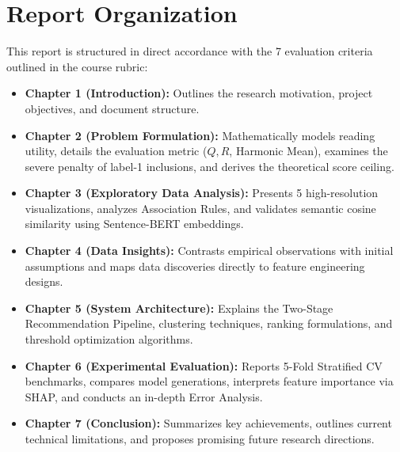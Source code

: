\section{Report Organization}
This report is structured in direct accordance with the 7 evaluation criteria outlined in the course rubric:
\begin{itemize}
  \item \textbf{Chapter 1 (Introduction):} Outlines the research motivation, project objectives, and document structure.
  \item \textbf{Chapter 2 (Problem Formulation):} Mathematically models reading utility, details the evaluation metric ($Q, R$, Harmonic Mean), examines the severe penalty of label-1 inclusions, and derives the theoretical score ceiling.
  \item \textbf{Chapter 3 (Exploratory Data Analysis):} Presents 5 high-resolution visualizations, analyzes Association Rules, and validates semantic cosine similarity using Sentence-BERT embeddings.
  \item \textbf{Chapter 4 (Data Insights):} Contrasts empirical observations with initial assumptions and maps data discoveries directly to feature engineering designs.
  \item \textbf{Chapter 5 (System Architecture):} Explains the Two-Stage Recommendation Pipeline, clustering techniques, ranking formulations, and threshold optimization algorithms.
  \item \textbf{Chapter 6 (Experimental Evaluation):} Reports 5-Fold Stratified CV benchmarks, compares model generations, interprets feature importance via SHAP, and conducts an in-depth Error Analysis.
  \item \textbf{Chapter 7 (Conclusion):} Summarizes key achievements, outlines current technical limitations, and proposes promising future research directions.
\end{itemize}
